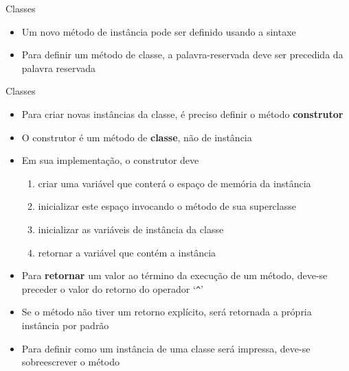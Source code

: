 \begin{frame}[fragile]{Classes}

    \begin{itemize}
        \item Um novo método de instância pode ser definido usando a  sintaxe


        \item Para definir um método de classe, a palavra-reservada  deve
            ser precedida da palavra reservada 

    \end{itemize}

\end{frame}
\begin{frame}[fragile]{Classes}

    \begin{itemize}
        \item Para criar novas instâncias da classe, é preciso definir o método \textbf{construtor}

        \item O construtor é um método de \textbf{classe}, não de instância

        \item Em sua implementação, o construtor deve
        \begin{enumerate}
            \item criar uma variável que conterá o espaço de memória da instância
            \item inicializar este espaço invocando o método  de sua
                superclasse
            \item inicializar as variáveis de instância da classe
            \item retornar a variável que contém a instância
        \end{enumerate}

        \item Para \textbf{retornar} um valor ao término da execução de um método, deve-se
            preceder o valor do retorno do operador `\texttt{\^}'

        \item Se o método não tiver um retorno explícito, será retornada a própria instância por
            padrão

        \item Para definir como um instância de uma classe será impressa, deve-se sobreescrever
            o método 

    \end{itemize}

\end{frame}

